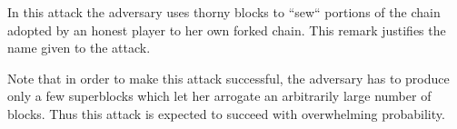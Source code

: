 In this attack the adversary uses thorny blocks to ``sew`` portions of
the chain adopted by an honest player to her own forked chain. This remark 
justifies the name given to the attack.

Note that in order to make this attack successful, the adversary has to produce
only a few superblocks which let her arrogate an arbitrarily large number of blocks. 
Thus this attack is expected to succeed with overwhelming probability.


